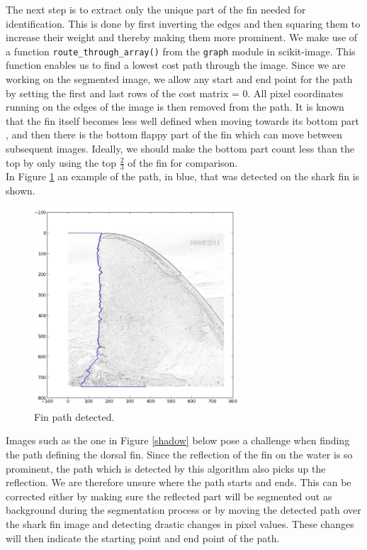 \documentclass[a4paper,10pt]{article}
\begin{document}
The next step is to extract only the unique part of the fin needed for
identification.   This is done by first inverting the edges and then squaring
them to increase their weight and thereby making them more prominent.  We make use of a function 
\texttt{route\_through\_array()}\cite{scikit} from the \texttt{graph} module in scikit-image.
 This function enables us to find a lowest cost path through the
 image.
Since we are working on the segmented image, we allow any start and end point
for the path by setting the first and last rows of the
  cost matrix = 0.  All
pixel coordinates running on the edges of the image is then removed from the
path.  It is known that the fin itself becomes less well defined when moving towards its bottom part
, and then there is the
  bottom flappy part of the fin which can move between subsequent images.
  Ideally, we should make the bottom part count less than the top by only using the top
$\frac{2}{3}$ of the fin for comparison.\\

In Figure \ref{fin} an example of the path, in blue, that was detected on the shark
fin is shown.
\begin{figure}[H]
 \centering
 \includegraphics[width=3in]{path.jpg}
 \caption{Fin path detected.}
 \label{fin}
\end{figure}

Images such as the one in Figure \ref{shadow} below pose a challenge when finding the path defining the dorsal fin.
Since the reflection of the fin on the water is so prominent, the path which is detected by this algorithm also
picks up the reflection.  We are therefore unsure
where the path starts and ends.  This can be corrected either by
making sure the reflected part will be segmented out as background during the segmentation process or by
moving the detected path over the shark fin image and detecting drastic changes in pixel
values.  These changes will then indicate the starting point and end point of the path.
\end{document}
